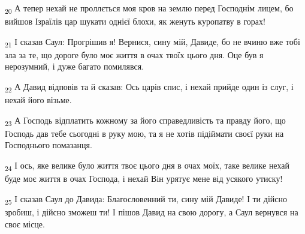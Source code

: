 \begin{tcolorbox}
\textsubscript{20} А тепер нехай не проллється моя кров на землю перед Господнім лицем, бо вийшов Ізраїлів цар шукати однієї блохи, як женуть куропатву в горах!
\end{tcolorbox}
\begin{tcolorbox}
\textsubscript{21} І сказав Саул: Прогрішив я! Вернися, сину мій, Давиде, бо не вчиню вже тобі зла за те, що дороге було моє життя в очах твоїх цього дня. Оце був я нерозумний, і дуже багато помилявся.
\end{tcolorbox}
\begin{tcolorbox}
\textsubscript{22} А Давид відповів та й сказав: Ось царів спис, і нехай прийде один із слуг, і нехай його візьме.
\end{tcolorbox}
\begin{tcolorbox}
\textsubscript{23} А Господь відплатить кожному за його справедливість та правду його, що Господь дав тебе сьогодні в руку мою, та я не хотів підіймати своєї руки на Господнього помазанця.
\end{tcolorbox}
\begin{tcolorbox}
\textsubscript{24} І ось, яке велике було життя твоє цього дня в очах моїх, таке велике нехай буде моє життя в очах Господа, і нехай Він урятує мене від усякого утиску!
\end{tcolorbox}
\begin{tcolorbox}
\textsubscript{25} І сказав Саул до Давида: Благословенний ти, сину мій Давиде! І ти дійсно зробиш, і дійсно зможеш ти! І пішов Давид на свою дорогу, а Саул вернувся на своє місце.
\end{tcolorbox}
